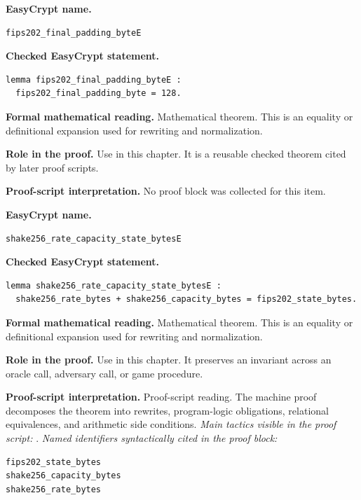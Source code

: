 \begin{formaltheorem}
\noindent\textbf{EasyCrypt name.}
\begin{lstlisting}[language=EasyCrypt,basicstyle=\ttfamily\scriptsize]
fips202_final_padding_byteE
\end{lstlisting}
\noindent\textbf{Checked EasyCrypt statement.}
\begin{lstlisting}[language=EasyCrypt,basicstyle=\ttfamily\scriptsize]
lemma fips202_final_padding_byteE :
  fips202_final_padding_byte = 128.
\end{lstlisting}
\noindent\textbf{Formal mathematical reading.}
Mathematical theorem. This is an equality or definitional expansion used for rewriting and normalization.

\noindent\textbf{Role in the proof.}
Use in this chapter. It is a reusable checked theorem cited by later proof scripts.

\noindent\textbf{Proof-script interpretation.}
No proof block was collected for this item.

\end{formaltheorem}

\begin{formaltheorem}
\noindent\textbf{EasyCrypt name.}
\begin{lstlisting}[language=EasyCrypt,basicstyle=\ttfamily\scriptsize]
shake256_rate_capacity_state_bytesE
\end{lstlisting}
\noindent\textbf{Checked EasyCrypt statement.}
\begin{lstlisting}[language=EasyCrypt,basicstyle=\ttfamily\scriptsize]
lemma shake256_rate_capacity_state_bytesE :
  shake256_rate_bytes + shake256_capacity_bytes = fips202_state_bytes.
\end{lstlisting}
\noindent\textbf{Formal mathematical reading.}
Mathematical theorem. This is an equality or definitional expansion used for rewriting and normalization.

\noindent\textbf{Role in the proof.}
Use in this chapter. It preserves an invariant across an oracle call, adversary call, or game procedure.

\noindent\textbf{Proof-script interpretation.}
Proof-script reading. The machine proof decomposes the theorem into rewrites, program-logic obligations, relational equivalences, and arithmetic side conditions.
\emph{Main tactics visible in the proof script:} .
\emph{Named identifiers syntactically cited in the proof block:}
\begin{lstlisting}[language=EasyCrypt,basicstyle=\ttfamily\scriptsize]
fips202_state_bytes
shake256_capacity_bytes
shake256_rate_bytes
\end{lstlisting}

\end{formaltheorem}

